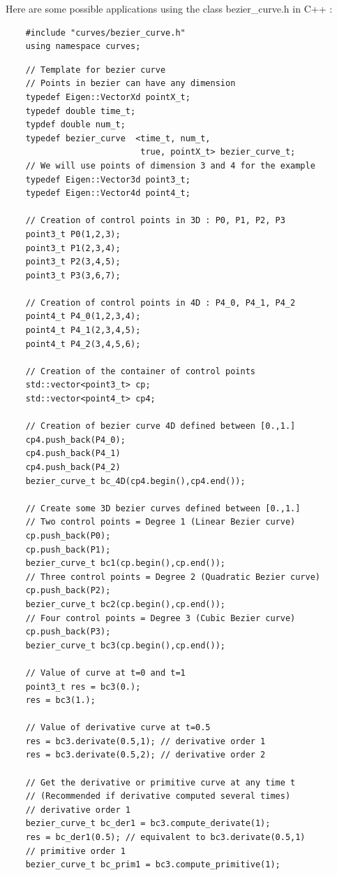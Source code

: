 \documentclass{article}
\begin{document}
    Here are some possible applications using the class bezier\_curve.h in C++ :\\
    \begin{lstlisting}
    #include "curves/bezier_curve.h"
    using namespace curves;
    \end{lstlisting}
    \begin{lstlisting}
    // Template for bezier curve
    // Points in bezier can have any dimension
    typedef Eigen::VectorXd pointX_t;
    typedef double time_t;
    typdef double num_t;
    typedef bezier_curve  <time_t, num_t, 
                           true, pointX_t> bezier_curve_t;
    // We will use points of dimension 3 and 4 for the example
    typedef Eigen::Vector3d point3_t;
    typedef Eigen::Vector4d point4_t;
    
    // Creation of control points in 3D : P0, P1, P2, P3
    point3_t P0(1,2,3);
    point3_t P1(2,3,4);
    point3_t P2(3,4,5);
    point3_t P3(3,6,7);
    
    // Creation of control points in 4D : P4_0, P4_1, P4_2
    point4_t P4_0(1,2,3,4);
    point4_t P4_1(2,3,4,5);
    point4_t P4_2(3,4,5,6);
    
    // Creation of the container of control points
    std::vector<point3_t> cp;
    std::vector<point4_t> cp4;
    
    // Creation of bezier curve 4D defined between [0.,1.]
    cp4.push_back(P4_0);
    cp4.push_back(P4_1)
    cp4.push_back(P4_2)
    bezier_curve_t bc_4D(cp4.begin(),cp4.end());
    
    // Create some 3D bezier curves defined between [0.,1.]
    // Two control points = Degree 1 (Linear Bezier curve)
    cp.push_back(P0);
    cp.push_back(P1);
    bezier_curve_t bc1(cp.begin(),cp.end());
    // Three control points = Degree 2 (Quadratic Bezier curve)
    cp.push_back(P2);
    bezier_curve_t bc2(cp.begin(),cp.end());
    // Four control points = Degree 3 (Cubic Bezier curve)
    cp.push_back(P3);
    bezier_curve_t bc3(cp.begin(),cp.end());
    
    // Value of curve at t=0 and t=1
    point3_t res = bc3(0.);
    res = bc3(1.);
    
    // Value of derivative curve at t=0.5
    res = bc3.derivate(0.5,1); // derivative order 1
    res = bc3.derivate(0.5,2); // derivative order 2
    
    // Get the derivative or primitive curve at any time t 
    // (Recommended if derivative computed several times)
    // derivative order 1
    bezier_curve_t bc_der1 = bc3.compute_derivate(1);
    res = bc_der1(0.5); // equivalent to bc3.derivate(0.5,1)
    // primitive order 1
    bezier_curve_t bc_prim1 = bc3.compute_primitive(1);
    

\end{lstlisting}
\end{document}
